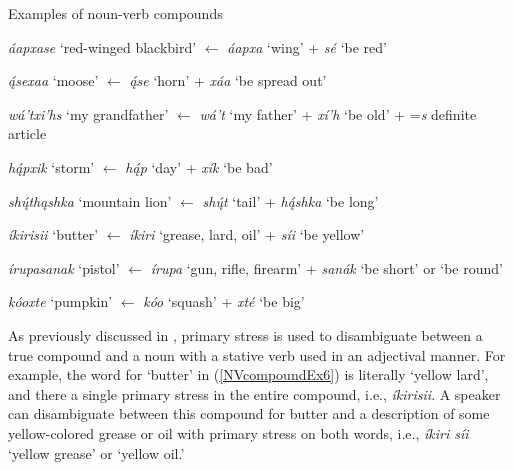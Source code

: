 \begin{exe}
\item\label{NVcompoundEx} Examples of noun-verb compounds

\begin{xlist}

\item\label{NVcompoundEx1} \textit{áapxase} `red-winged blackbird' $\leftarrow$ \textit{áapxa} `wing' + \textit{sé} `be red'

\item\label{NVcompoundEx2} \textit{ą́sexaa} `moose' $\leftarrow$ \textit{ą́se} `horn' + \textit{xáa} `be spread out'

\item\label{NVcompoundEx3} \textit{wá'txi'hs} `my grandfather' $\leftarrow$ \textit{wá't} `my father' + \textit{xí'h} `be old' + =\textit{s} definite article

\item\label{NVcompoundEx4} \textit{hą́pxik} `storm' $\leftarrow$ \textit{hą́p} `day' + \textit{xík} `be bad'

\item\label{NVcompoundEx5} \textit{shų́thąshka} `mountain lion' $\leftarrow$ \textit{shų́t} `tail' + \textit{hą́shka} `be long'

\item\label{NVcompoundEx6} \textit{íkirisii} `butter' $\leftarrow$ \textit{íkiri} `grease, lard, oil' + \textit{síi} `be yellow'

\item\label{NVcompoundEx7} \textit{írupasanak} `pistol' $\leftarrow$ \textit{írupa} `gun, rifle, firearm' + \textit{sanák} `be short' or `be round'

\item\label{NVcompoundEx8} \textit{kóoxte} `pumpkin' $\leftarrow$ \textit{kóo} `squash' + \textit{xté} `be big'

\end{xlist}

\end{exe}

As previously discussed in , primary stress is used to disambiguate between a true compound and a noun with a stative verb used in an adjectival manner. For example, the word for `butter' in (\ref{NVcompoundEx6}) is literally `yellow lard', and there a single primary stress in the entire compound, i.e., \textit{íkirisii}. A speaker can disambiguate between this compound for butter and a description of some yellow-colored grease or oil with primary stress on both words, i.e., \textit{íkiri síi} `yellow grease' or `yellow oil.'

